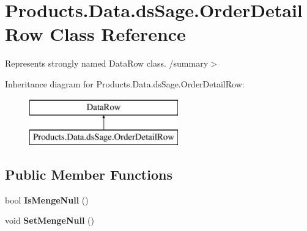 \hypertarget{class_products_1_1_data_1_1ds_sage_1_1_order_detail_row}{}\section{Products.\+Data.\+ds\+Sage.\+Order\+Detail\+Row Class Reference}
\label{class_products_1_1_data_1_1ds_sage_1_1_order_detail_row}


Represents strongly named Data\+Row class. /summary$>$  


Inheritance diagram for Products.\+Data.\+ds\+Sage.\+Order\+Detail\+Row\+:\begin{figure}[H]
\begin{center}
\leavevmode
\includegraphics[height=2.000000cm]{class_products_1_1_data_1_1ds_sage_1_1_order_detail_row}
\end{center}
\end{figure}
\subsection*{Public Member Functions}
\begin{DoxyCompactItemize}
\item 
bool {\bfseries Is\+Menge\+Null} ()\hypertarget{class_products_1_1_data_1_1ds_sage_1_1_order_detail_row_ac0e8cb4aac929748d9382b869b9ee1b3}{}\label{class_products_1_1_data_1_1ds_sage_1_1_order_detail_row_ac0e8cb4aac929748d9382b869b9ee1b3}

\item 
void {\bfseries Set\+Menge\+Null} ()\hypertarget{class_products_1_1_data_1_1ds_sage_1_1_order_detail_row_a0b3c5296371c9540a5e27ccbc6cdc56c}{}\label{class_products_1_1_data_1_1ds_sage_1_1_order_detail_row_a0b3c5296371c9540a5e27ccbc6cdc56c}

\end{DoxyCompactItemize}
